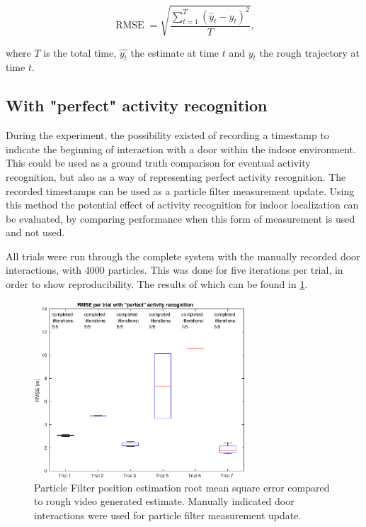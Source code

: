 \begin{equation}
	\displaystyle \operatorname {RMSE} ={\sqrt {\frac {\sum _{t=1}^{T}({\hat {y}}_{t}-y_{t})^{2}}{T}}},
	\label{eq:RMSE}
\end{equation}

where $T$ is the total time, $\hat{y_t}$ the estimate at time $t$ and $y_t$ the rough trajectory at time $t$.
\subsection{With "perfect" activity recognition}
During the experiment, the possibility existed of recording a timestamp to indicate the beginning of interaction with a door within the indoor environment. This could be used as a ground truth comparison for eventual activity recognition, but also as a way of representing perfect activity recognition. The recorded timestamps can be used as a particle filter measurement update. Using this method the potential effect of activity recognition for indoor localization can be evaluated, by comparing performance when this form of measurement is used and not used. \par 

All trials were run through the complete system with the manually recorded door interactions, with 4000 particles. This was done for five iterations per trial, in order to show reproducibility. The results of which can be found in \cref{fig:pf_boxplot}.

\begin{figure}[H]
	\centering
	\includegraphics[width=0.7\textwidth]{images/20201118_1212_RMSE_per_trial_with_perfect_activity_recognition}
	\caption[Particle Filter position estimation performance with manual door interaction]{Particle Filter position estimation root mean square error compared to rough video generated estimate. Manually indicated door interactions were used for particle filter measurement update.}	
	\label{fig:pf_boxplot}
\end{figure}

